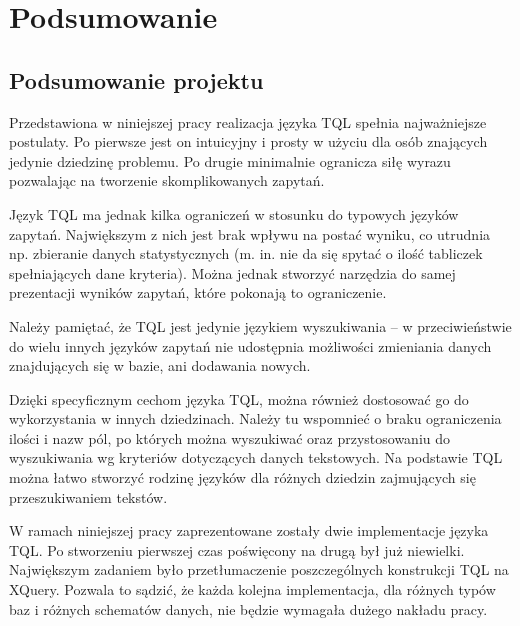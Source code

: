 \chapter*{Podsumowanie}
\section*{Podsumowanie projektu}
Przedstawiona w niniejszej pracy realizacja języka TQL spełnia najważniejsze postulaty. 
Po pierwsze jest on intuicyjny i prosty w użyciu dla osób znających jedynie dziedzinę problemu.
Po drugie minimalnie ogranicza siłę wyrazu pozwalając na tworzenie skomplikowanych zapytań.

Język TQL ma jednak kilka ograniczeń w stosunku do typowych języków zapytań. 
Największym z nich jest brak wpływu na postać wyniku, co utrudnia np. zbieranie danych statystycznych 
(m. in. nie da się spytać o ilość tabliczek spełniających dane kryteria). 
Można jednak stworzyć narzędzia do samej prezentacji wyników zapytań, które pokonają to ograniczenie. 

Należy pamiętać, że TQL jest jedynie językiem wyszukiwania -- w przeciwieństwie do wielu innych języków zapytań
nie udostępnia możliwości zmieniania danych znajdujących się w bazie, ani dodawania nowych. 

Dzięki specyficznym cechom języka TQL, można również dostosować go do wykorzystania w innych dziedzinach. 
Należy tu wspomnieć o braku ograniczenia ilości i nazw pól, po których można wyszukiwać oraz przystosowaniu 
do wyszukiwania wg kryteriów dotyczących danych tekstowych. 
Na podstawie TQL można łatwo stworzyć rodzinę języków dla różnych dziedzin zajmujących się przeszukiwaniem tekstów.

W ramach niniejszej pracy zaprezentowane zostały dwie implementacje języka TQL. 
Po stworzeniu pierwszej czas poświęcony na drugą był już niewielki. 
Największym zadaniem było przetłumaczenie poszczególnych konstrukcji TQL na XQuery. 
Pozwala to sądzić, że każda kolejna implementacja, dla różnych typów baz i różnych schematów danych, 
nie będzie wymagała dużego nakładu pracy. 

\newpage 


